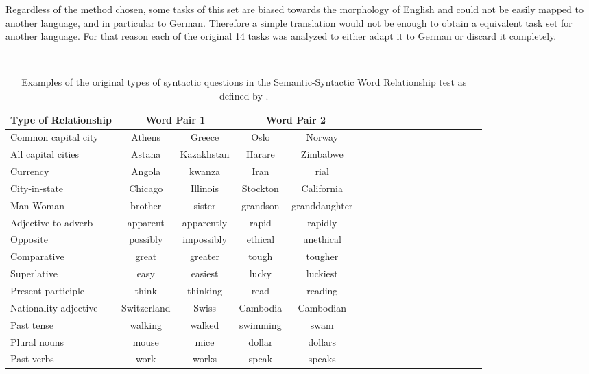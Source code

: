 Regardless of the method chosen, some tasks of this set are biased towards
the morphology of English and could not be easily mapped to another language,
and in particular to German. Therefore a simple translation would not be
enough to obtain a equivalent task set for another language. For that reason
each of the original 14 tasks was analyzed to either adapt it to German or
discard it completely. 


\renewcommand{\arraystretch}{1.3}

\begin{table}[h]\
  \caption{Examples of the original types of syntactic questions in the
    Semantic-Syntactic Word Relationship test as defined
    by \cite{DBLP:journals/corr/abs-1301-3781}.}
  \label{tab:task_original_en}

  \begin{tabular}{ |l| |c|*{4}{c| |c| c | c }  }

  \hline           
  Type of Relationship &  \multicolumn{2}{c||}{Word Pair 1} &
  \multicolumn{2}{c|}{Word Pair 2} \\  \hline           
  Common capital city & Athens & Greece & Oslo  & Norway \\ 
  All capital cities  & Astana & Kazakhstan &  Harare & Zimbabwe  \\
  Currency & Angola & kwanza & Iran & rial \\  
  City-in-state  & Chicago & Illinois & Stockton & California \\  
  Man-Woman & brother & sister  & grandson & granddaughter \\  \hline  
  Adjective to adverb & apparent & apparently & rapid & rapidly  \\  
  Opposite & possibly & impossibly & ethical & unethical \\  
  Comparative & great & greater & tough & tougher \\  
  Superlative & easy & easiest & lucky & luckiest \\  
  Present participle & think & thinking & read & reading \\  
  Nationality adjective & Switzerland & Swiss & Cambodia  & Cambodian  \\  
  Past tense & walking & walked & swimming & swam \\ 
  Plural nouns  & mouse & mice & dollar & dollars \\  
  Past verbs & work & works & speak  & speaks  \\  \hline  
  
    
  
  
\end{tabular}
\end{table}

